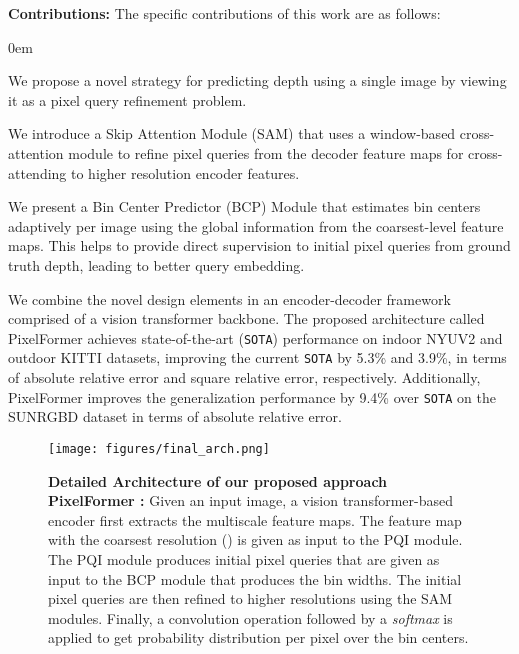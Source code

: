 \documentclass[10pt,twocolumn,letterpaper]{article}
\newcommand{\myfirstpara}[1]{\par \noindent \textbf{#1:}}
\newcommand\SOTA{\texttt{SOTA}\xspace}
\begin{document}
\myfirstpara{Contributions}
The specific contributions of this work are as follows:
\begin{enumerate*}[label=\textbf{(\arabic*)}]
\itemsep0em 
\item We propose a novel strategy for predicting depth using a single image by viewing it as a pixel query refinement problem. 
\item We introduce a Skip Attention Module (SAM) that uses a window-based cross-attention module to refine pixel queries from the decoder feature maps for cross-attending to higher resolution encoder features. 
\item We present a Bin Center Predictor (BCP) Module that estimates bin centers adaptively per image using the global information from the coarsest-level feature maps. This helps to provide direct supervision to initial pixel queries from ground truth depth, leading to better query embedding.
\item We combine the novel design elements in an encoder-decoder framework comprised of a vision transformer backbone. The proposed architecture called PixelFormer achieves state-of-the-art (\SOTA) performance on indoor NYUV2 and outdoor KITTI datasets, improving the current \SOTA by 5.3\% and 3.9\%, in terms of absolute relative error and square relative error, respectively. Additionally, PixelFormer improves the generalization performance by 9.4\% over \SOTA on the SUNRGBD dataset in terms of absolute relative error.
\end{enumerate*} 
\begin{figure*}[t]
	\begin{center}
		\texttt{[image: figures/final\_arch.png]}
	\end{center}
\vspace{-0.5em}
	\caption{\textbf{Detailed Architecture of our proposed approach PixelFormer :} Given an input image, a vision transformer-based encoder first extracts the multiscale feature maps. The feature map with the coarsest resolution () is given as input to the PQI module. The PQI module produces initial pixel queries that are given as input to the BCP module that produces the bin widths. The initial pixel queries are then refined to higher resolutions using the SAM modules. Finally, a convolution operation followed by a \emph{softmax} is applied to get probability distribution per pixel over the bin centers. }
	\label{fig:arch}
\end{figure*}
\end{document}
